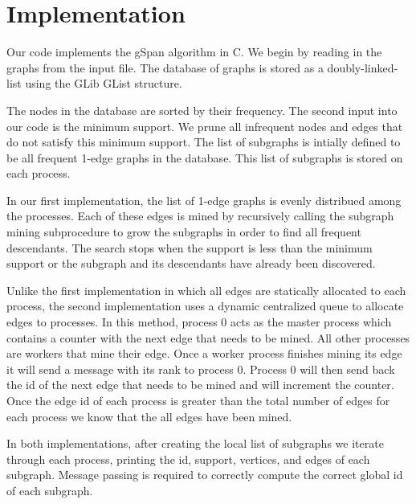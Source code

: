 \section{Implementation}
\label{sec:implementation}

Our code implements the gSpan algorithm in C. We begin by reading in
the graphs from the input file. The database of graphs is
stored as a doubly-linked-list using the GLib GList structure.

The nodes in the database are sorted by their frequency. The second input
into our code is the minimum support. We prune all infrequent nodes and
edges that do not satisfy this minimum support. The list of subgraphs is
intially defined to be all frequent 1-edge graphs in the database. 
This list of subgraphs is stored on each process.

In our first implementation, the list of 1-edge graphs is evenly distribued
among the processes. Each of these edges is mined by recursively calling the
subgraph mining subprocedure to grow the subgraphs in order to find all
frequent descendants.
The search stops when the support is less than the
minimum support or the subgraph and its descendants have already been
discovered.

Unlike the first implementation in which all edges are statically allocated
to each process, the second implementation uses a dynamic centralized queue
to allocate edges to processes. In this method, process 0 acts as the master
process which contains a counter with the next edge that needs to be mined.
All other processes are workers that mine their edge. Once a worker process
finishes mining its edge it will send a message with its rank to process 0.
Process 0 will then send back the id of the next edge that needs to be mined
and will increment the counter. Once the edge id of each process is greater
than the total number of edges for each process we know that the all edges
have been mined. 

In both implementations, after creating the local list of subgraphs we
iterate through each process, printing the id, support, vertices, and
edges of each subgraph.
Message passing is required to correctly compute the correct global 
id of each subgraph.

